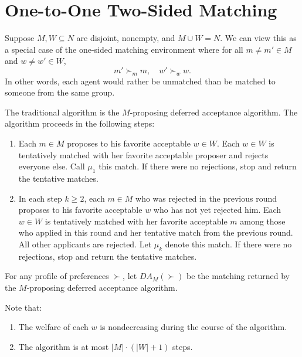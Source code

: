 \section{One-to-One Two-Sided Matching}
Suppose $M,W \subseteq N$ are disjoint, nonempty, and $M \cup W = N$.
We can view this as a special case of the one-sided matching environment where for all $m \ne m' \in M$ and $w \ne w' \in W$, \[
	m' \succ_m m, \quad w' \succ_w w
.\] In other words, each agent would rather be unmatched than be matched to someone from the same group.

\begin{definition}
	The traditional algorithm is the $M$-proposing deferred acceptance algorithm.
	The algorithm proceeds in the following steps:
	\begin{enumerate}[label = (\arabic*)]
		\item Each $m \in M$ proposes to his favorite acceptable $w \in W$. Each $w \in W$ is tentatively matched with her favorite acceptable proposer and rejects everyone else. Call $\mu_1$ this match. If there were no rejections, stop and return the tentative matches.
		\item In each step $k \ge 2$, each $m \in M$ who was rejected in the previous round proposes to his favorite acceptable $w$ who has not yet rejected him. Each $w \in W$ is tentatively matched with her favorite acceptable $m$ among those who applied in this round and her tentative match from the previous round. All other applicants are rejected. Let $\mu_k$ denote this match. If there were no rejections, stop and return the tentative matches.
	\end{enumerate}

	For any profile of preferences $\succ$, let $DA_M(\succ)$ be the matching returned by the $M$-proposing deferred acceptance algorithm.
\end{definition}

\begin{remark}
	Note that:
	\begin{enumerate}[label = (\roman*)]
		\item The welfare of each $w$ is nondecreasing during the course of the algorithm.
		\item The algorithm is at most $\left| M \right| \cdot (\left| W \right| + 1)$ steps.
	\end{enumerate}
\end{remark}

